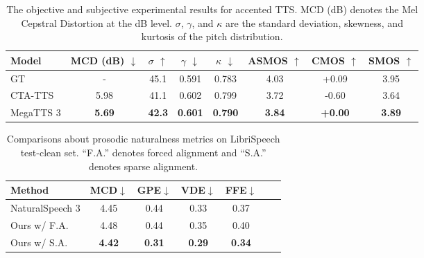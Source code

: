 \begin{table*}[!t]
\small
\centering
\begin{tabular}{@{}l|cccc|ccc@{}}
\toprule
\bfseries Model & \bfseries MCD (dB) $\downarrow$ & \bfseries $\sigma$ $\uparrow$ & \bfseries $\gamma$ $\downarrow$ & \bfseries $\kappa$ $\downarrow$ & \bfseries ASMOS $\uparrow$ & \bfseries CMOS $\uparrow$ & \bfseries SMOS $\uparrow$ \\       
\midrule
GT      &   - & 45.1 & 0.591 & 0.783 & 4.03 & +0.09 & 3.95 \\

CTA-TTS & 5.98  & 41.1 & 0.602 & 0.799 & 3.72 & -0.60 & 3.64 \\

MegaTTS 3   & \bfseries 5.69 & \bfseries 42.3  & \bfseries 0.601  & \bfseries 0.790  & \bfseries 3.84 & \bfseries +0.00 & \bfseries 3.89 \\

\bottomrule
\end{tabular}
\caption{The objective and subjective experimental results for accented TTS. MCD (dB) denotes the Mel Cepstral Distortion at the dB level. $\sigma$, $\gamma$, and $\kappa$ are the standard deviation, skewness, and kurtosis of the pitch distribution.}
\label{table:accent-tts-result}
\end{table*}



\begin{table}[!t]
\small
\centering
\begin{tabular}{@{}l|cccccc@{}}
\toprule
\bfseries Method & \bfseries MCD$\downarrow$ & \bfseries GPE$\downarrow$ & \bfseries VDE$\downarrow$ & \bfseries FFE$\downarrow$ \\       
\midrule
NaturalSpeech 3      &  4.45  & 0.44 & 0.33 & 0.37\\
Ours w/ F.A. &  4.48   & 0.44 & 0.35 & 0.40 \\
\midrule
Ours w/ S.A. & \bfseries 4.42 & \bfseries 0.31 & \bfseries 0.29 & \bfseries 0.34 \\

\bottomrule
\end{tabular}
\caption{Comparisons about prosodic naturalness metrics on LibriSpeech test-clean set. ``F.A.'' denotes forced alignment and ``S.A.'' denotes sparse alignment.}
\label{table:expressiveness_exp_40}
\end{table}


